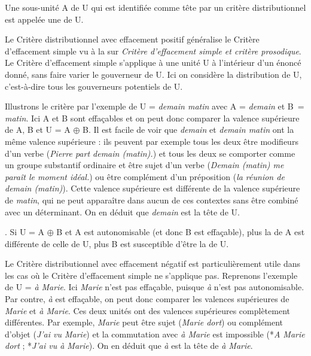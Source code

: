 {Une sous-unité A de U qui est identifiée comme tête par un critère distributionnel est appelée une  de U.}

Le Critère distributionnel avec effacement positif généralise le Critère d’effacement simple vu à la  sur \textit{Critère d’effacement simple et critère prosodique}. Le Critère d’effacement simple s’applique à une unité U à l’intérieur d’un énoncé donné, sans faire varier le gouverneur de U. Ici on considère la distribution de U, c’est-à-dire tous les gouverneurs potentiels de U.

Illustrons le critère par l’exemple de U = \textit{demain matin} avec A = \textit{demain} et B~= \textit{matin}. Ici A et B sont effaçables et on peut donc comparer la valence supérieure de A, B et U = A ${\oplus}$ B. Il est facile de voir que \textit{demain} et \textit{demain matin} ont la même valence supérieure : ils peuvent par exemple tous les deux être modifieurs d'un verbe (\textit{Pierre part demain (matin).}) et tous les deux se comporter comme un groupe substantif ordinaire et être sujet d'un verbe (\textit{Demain (matin) me paraît le moment idéal.}) ou être complément d'un préposition (\textit{la réunion de demain (matin)}). Cette valence supérieure est différente de la valence supérieure de \textit{matin}, qui ne peut apparaître dans aucun de ces contextes sans être combiné avec un déterminant. On en déduit que \textit{demain} est la tête de U.\largerpage[-1]

{. Si U = A ${\oplus}$ B et A est autonomisable (et donc B est effaçable),  plus la  de A est différente de celle de U, plus B est susceptible d'être la  de U.}

\begin{sloppypar}
Le Critère distributionnel avec effacement négatif est particulièrement utile dans les cas où le Critère d’effacement simple ne s’applique pas. Reprenons l’exemple de U = \textit{à Marie}. Ici \textit{Marie} n’est pas effaçable, puisque \textit{à} n’est pas autonomisable. Par contre, \textit{à} est effaçable, on peut donc comparer les valences supérieures de \textit{Marie} et \textit{à Marie}. Ces deux unités ont des valences supérieures complètement différentes. Par exemple, \textit{Marie} peut être sujet (\textit{Marie dort}) ou complément d’objet (\textit{J’ai vu Marie}) et la commutation avec \textit{à Marie} est impossible (*\textit{A Marie dort} ; *\textit{J’ai vu à Marie}). On en déduit que \textit{à} est la tête de \textit{à Marie}.
\end{sloppypar}

